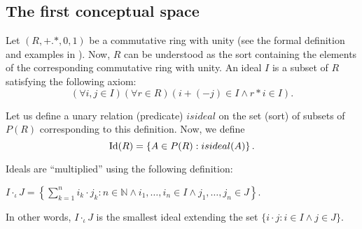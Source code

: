 

\subsection{The first conceptual space}
Let $(R,+.*,0,1)$ be a commutative ring with unity (see the formal
definition and examples in \textcite{eisenbud}). Now, $R$ can be understood
as the sort containing the elements of the corresponding commutative
ring with unity.  An ideal $I$ is a subset of $R$ satisfying the
following axiom:
\[(\forall i,j\in I)(\forall r\in R)(i+(-j)\in I \wedge r*i\in I).\]

Let us define a unary relation (predicate) $isideal$
on the set (sort) of subsets of $P(R)$ corresponding to this definition.
Now, we define
\[{\rm Id}(R)=\left\{A \in P(R) : isideal(A) \right\}.\]

Ideals are ``multiplied'' using the following definition:
%
%

\begin{adjustbox}{width=\columnwidth}
  \(
  \displaystyle
  I\cdot_{\iota} J=\left\{\sum_{k=1}^ni_k\cdot j_k:n \in \mathbb{N}
  \wedge i_1, \ldots, i_n\in I \wedge j_1, \ldots, j_n\in J \right\}.
  \)
\end{adjustbox}
In other words, $I\cdot_{\iota} J$ is the smallest ideal extending the
set $\{  i \cdot j: i \in I \wedge j \in J \}$.

